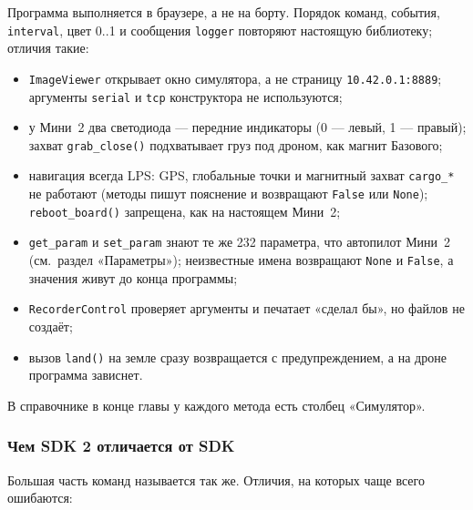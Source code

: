 \begin{infobox}
Программа выполняется в браузере, а не на борту. Порядок команд, события, \verb|interval|, цвет 0..1 и сообщения \verb|logger| повторяют настоящую библиотеку; отличия такие:
\begin{itemize}
    \item \verb|ImageViewer| открывает окно симулятора, а не страницу \texttt{10.42.0.1:8889}; аргументы \verb|serial| и \verb|tcp| конструктора не используются;
    \item у Мини~2 два светодиода --- передние индикаторы (0 --- левый, 1 --- правый); захват \verb|grab_close()| подхватывает груз под дроном, как магнит Базового;
    \item навигация всегда LPS: GPS, глобальные точки и магнитный захват \verb|cargo_*| не работают (методы пишут пояснение и возвращают \verb|False| или \verb|None|); \verb|reboot_board()| запрещена, как на настоящем Мини~2;
    \item \verb|get_param| и \verb|set_param| знают те же 232 параметра, что автопилот Мини~2 (см.\ раздел «Параметры»); неизвестные имена возвращают \verb|None| и \verb|False|, а значения живут до конца программы;
    \item \verb|RecorderControl| проверяет аргументы и печатает «сделал бы», но файлов не создаёт;
    \item вызов \verb|land()| на земле сразу возвращается с предупреждением, а на дроне программа зависнет.
\end{itemize}
В справочнике в конце главы у каждого метода есть столбец «Симулятор».
\end{infobox}

\subsubsection*{Чем SDK 2 отличается от SDK}

Большая часть команд называется так же. Отличия, на которых чаще всего ошибаются:

